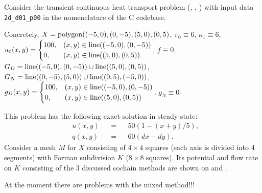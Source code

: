 \begin{example}
  \label{cmc/diffusion/continuous/transient/examples/2d_d01_p00-example}
  Consider the transient continuous heat transport problem
  (,
   ,
   )
  with input data \verb|2d_d01_p00| in the nomenclature of the C codebase.

  Concretely,
    $X = {\rm polygon}((-5, 0), (0, -5), (5, 0), (0, 5)$,
    $\pi_0 \equiv 6$,
    $\kappa_1 \equiv 6$,
    \newline
    $u_0(x, y) =
      \begin{cases}
        100, & (x, y) \in {\rm line}((-5, 0), (0, -5)) \\
        0, & (x, y) \in {\rm line}((5, 0), (0, 5))
      \end{cases}$,
    $f \equiv 0$,
    \newline
    $G_D = {\rm line}((-5, 0), (0, -5)) \cup {\rm line}((5, 0), (0, 5))$,
    $G_N = {\rm line}((0, -5), (5, 0)) \cup {\rm line}((0, 5), (-5, 0))$,
    \newline
    $g_D(x, y) =
      \begin{cases}
        100, & (x, y) \in {\rm line}((-5, 0), (0, -5)) \\
        0, & (x, y) \in {\rm line}((5, 0), (0, 5))
      \end{cases}$,
    $g_N \equiv 0$.

  This problem has the following exact solution in steady-state:
  \begin{subequations}
    \begin{alignat}{3}
      & u(x, y) && = && 50 (1 - (x + y) / 5), \\
      & q(x, y) && = && 60 (d x - d y).
    \end{alignat}
  \end{subequations}
  Consider a mesh $M$ for $X$ consisting of $4 \times 4$ squares (each axis is
  divided into $4$ segments) with Forman subdivision $K$ ($8 \times 8$ squares).
  Its potential and flow rate on $K$ consisting of the $3$ discussed cochain
  methods are shown on
  and
  .

  {\color{red} At the moment there are problems with the mixed method!!!}
\end{example}
